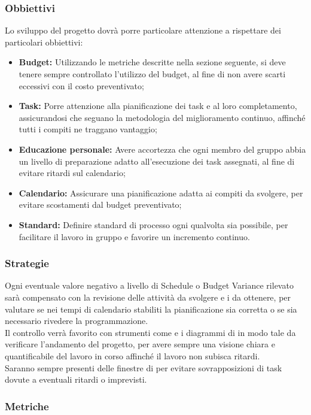 \documentclass[PianoDiQualifica.tex]{subfiles}
\begin{document}
\subsubsection{Obbiettivi}
Lo sviluppo del progetto dovrà porre particolare attenzione a rispettare dei particolari obbiettivi:
\begin{itemize}
	\item \textbf{Budget:} Utilizzando le metriche descritte nella sezione seguente, si deve tenere sempre controllato l'utilizzo del budget, al fine di non avere scarti eccessivi con il costo preventivato;
	\item \textbf{Task:} Porre attenzione alla pianificazione dei task e al loro completamento, assicurandosi che seguano la metodologia del miglioramento continuo, affinché tutti i compiti ne traggano vantaggio;
	\item \textbf{Educazione personale:} Avere accortezza che ogni membro del gruppo abbia un livello di preparazione adatto all'esecuzione dei task assegnati, al fine di evitare ritardi sul calendario;
	\item \textbf{Calendario:} Assicurare una pianificazione adatta ai compiti da svolgere, per evitare scostamenti dal budget preventivato;
	\item \textbf{Standard:} Definire standard di processo ogni qualvolta sia possibile, per facilitare il lavoro in gruppo e favorire un incremento continuo.
\end{itemize}

\subsubsection{Strategie}
Ogni eventuale valore negativo a livello di Schedule o Budget Variance rilevato sarà compensato con la revisione delle attività da svolgere e i  da ottenere, per valutare se nei tempi di calendario stabiliti la pianificazione sia corretta o se sia necessario rivedere la programmazione.\\
Il controllo verrà favorito con strumenti come  e i diagrammi di  in modo tale da verificare l'andamento del progetto, per avere sempre una visione chiara e quantificabile del lavoro in corso affinché il lavoro non subisca ritardi.\\
Saranno sempre presenti delle finestre di  per evitare sovrapposizioni di task dovute a eventuali ritardi o imprevisti. 

\subsubsection{Metriche} 
\end{document}
